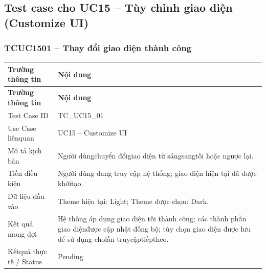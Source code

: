 \subsection{Test case cho UC15 – Tùy chỉnh giao diện (Customize UI)}
\subsubsection{TCUC1501 – Thay đổi giao diện thành công}
\begin{longtable}{|L{0.24\textwidth}|L{0.70\textwidth}|}
\hline
\textbf{Trường thông tin} & \textbf{Nội dung} \\
\hline
\endfirsthead
\hline
\textbf{Trường thông tin} & \textbf{Nội dung} \\
\hline
\endhead
Test Case ID & TC\_UC15\_01 \\
\hline
Use Case liênquan & UC15 – Customize UI \\
\hline
Mô tả kịch bản & Người dùngchuyển đổigiao diện từ sángsangtối hoặc ngược lại. \\
\hline
Tiền điều kiện & Người dùng đang truy cập hệ thống; giao diện hiện tại đã được khởi\newline tạo. \\
\hline
Dữ liệu đầu vào & Theme hiện tại: Light; Theme được chọn: Dark. \\
\hline
Kết quả mong đợi & Hệ thống áp dụng giao diện tối thành công; các thành phần giao diện\newline được cập nhật đồng bộ; tùy chọn giao diện được lưu để sử dụng cho\newline lần truycậptiếptheo. \\
\hline
Kếtquả thực tế / Status & Pending \\
\hline
\end{longtable}
\vspace{-0.5\baselineskip}
